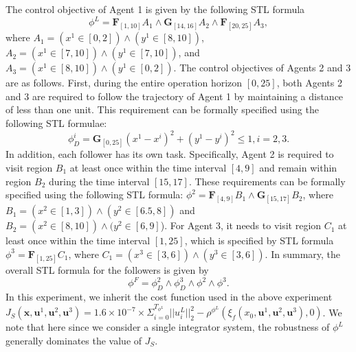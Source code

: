 \documentclass[letterpaper, 10 pt, conference]{ieeeconf}
\begin{document}
The control objective of Agent 1 is given by the following STL formula 
\[ 
\phi^L=\mathbf{F}_{[1,10]}A_1 \land \mathbf{G}_{[14,16]}A_2 \land \mathbf{F}_{[20,25]}A_3,
\]
where $A_1=(x^1\in [0,2])\land (y^1\in [8,10])$, $A_2=(x^1\in [7,10])\land (y^1\in [7,10])$, and $A_3= (x^1\in [8,10])\land (y^1\in [0,2])$.
The control objectives of Agents 2 and 3 are as follows. First, during the entire operation horizon $[0,25]$, both Agents 2 and 3 are required to follow the trajectory of Agent 1 by maintaining a distance of less than one unit. This requirement can be formally specified using the following STL formulae:
\[
\phi_D^i=\mathbf{G}_{[0,25]} (x^1-x^i)^2+(y^1-y^i)^2\leq 1, i=2,3.
\] 
In addition, each follower has its own task. Specifically, Agent 2 is required to visit region $B_1$ at least once within the time interval $[4,9]$ and remain within region $B_2$ during the time interval $[15,17]$. These requirements can be formally specified using the following STL formula: 
$\phi^2=\mathbf{F}_{[4,9]}B_1 \land \mathbf{G}_{[15,17]}B_2$, where $B_1=(x^2\in [1,3])\land (y^2\in [6.5,8])$ and $B_2= (x^2\in [8,10])\land (y^2\in [6,9]$). 
For Agent 3, it needs to  visit region $C_1$ at least once within the time interval $[1,25]$, which is specified by STL formula $\phi^3=\mathbf{F}_{[1,25]}C_1$, where $C_1=(x^3\in [3,6])\land (y^3\in [3,6])$. 
In summary, the overall STL formula for the followers is given by  
\[
\phi^F=\phi_D^2\land \phi_D^3 \land \phi^2 \land \phi^3.
\]
In this experiment, we inherit the cost function used in the above experiment $J_S(\mathbf{x},\mathbf{u}^1,\mathbf{u}^2, \mathbf{u}^3)= 1.6\times 10^{-7}\times\Sigma_{i=0}^{T_{\phi^L}}||u^L_i||_2^2-\rho^{\phi^L}(\xi_f(x_0,\mathbf{u}^1,\mathbf{u}^2, \mathbf{u}^3),0)$. 
We note that here since we consider a single integrator system, 
the robustness of $\phi^L$ generally dominates the value of $J_S$.

\end{document}
